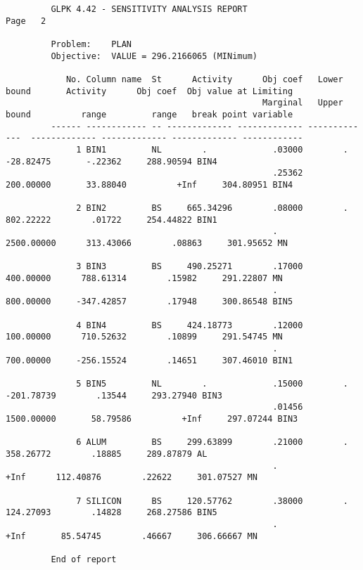 \newpage

\begin{landscape}
\begin{footnotesize}
\begin{verbatim}
         GLPK 4.42 - SENSITIVITY ANALYSIS REPORT                                                                         Page   2

         Problem:    PLAN
         Objective:  VALUE = 296.2166065 (MINimum)

            No. Column name  St      Activity      Obj coef   Lower bound       Activity      Obj coef  Obj value at Limiting
                                                   Marginal   Upper bound          range         range   break point variable
         ------ ------------ -- ------------- ------------- -------------  ------------- ------------- ------------- ------------
              1 BIN1         NL        .             .03000        .           -28.82475       -.22362     288.90594 BIN4
                                                     .25362     200.00000       33.88040          +Inf     304.80951 BIN4

              2 BIN2         BS     665.34296        .08000        .           802.22222        .01722     254.44822 BIN1
                                                     .         2500.00000      313.43066        .08863     301.95652 MN

              3 BIN3         BS     490.25271        .17000     400.00000      788.61314        .15982     291.22807 MN
                                                     .          800.00000     -347.42857        .17948     300.86548 BIN5

              4 BIN4         BS     424.18773        .12000     100.00000      710.52632        .10899     291.54745 MN
                                                     .          700.00000     -256.15524        .14651     307.46010 BIN1

              5 BIN5         NL        .             .15000        .          -201.78739        .13544     293.27940 BIN3
                                                     .01456    1500.00000       58.79586          +Inf     297.07244 BIN3

              6 ALUM         BS     299.63899        .21000        .           358.26772        .18885     289.87879 AL
                                                     .               +Inf      112.40876        .22622     301.07527 MN

              7 SILICON      BS     120.57762        .38000        .           124.27093        .14828     268.27586 BIN5
                                                     .               +Inf       85.54745        .46667     306.66667 MN

         End of report
\end{verbatim}
\end{footnotesize}
\end{landscape}

